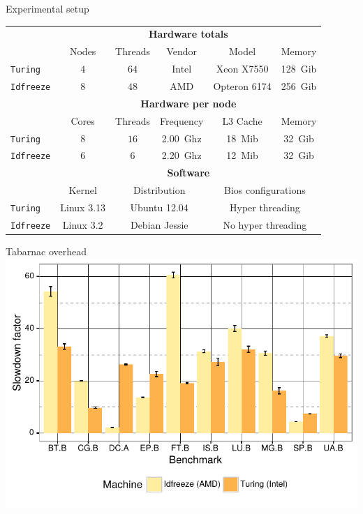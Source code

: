 \documentclass[xcolor={usenames,dvipsnames},hyperref={pdfusetitle}]{beamer}
\begin{document}
\setcounter{framenumber}{\value{finalframe}}
\begin{frame}{Experimental setup}
    \small
    \centering
    \begin{tabular}{lccccc}
        \toprule
        & \multicolumn{5}{c}{\textbf{Hardware totals}}\\
        \cmidrule(lr){2-6}
        & Nodes & Threads & Vendor & Model & Memory \\
        \cmidrule(lr){2-6}
        \texttt{Turing}   & $4$ & $64$ & Intel & Xeon X7550   & \SI{128}{Gib} \\
        \texttt{Idfreeze} & $8$ & $48$ & AMD   & Opteron 6174 & \SI{256}{Gib}\\
        \midrule
        & \multicolumn{5}{c}{\textbf{Hardware per node}}\\
        \cmidrule(lr){2-6}
        & Cores & Threads & Frequency & L3 Cache & Memory \\
        \cmidrule(lr){2-6}
        \texttt{Turing}   & $8$ & $16$ & \SI{2.00}{Ghz}& \SI{18}{Mib} & \SI{32}{Gib} \\
        \texttt{Idfreeze} & $6$ & $6$  & \SI{2.20}{Ghz}& \SI{12}{Mib} & \SI{32}{Gib}\\
        \midrule
        & \multicolumn{5}{c}{\textbf{Software}}\\
        \cmidrule(lr){2-6}
        & Kernel & \multicolumn{2}{c}{Distribution} &
        \multicolumn{2}{c}{Bios configurations} \\
        \cmidrule(lr){2-6}
        \texttt{Turing}   & Linux 3.13 & \multicolumn{2}{c}{Ubuntu 12.04} &
        \multicolumn{2}{c}{Hyper threading} \\
        \texttt{Idfreeze} & Linux 3.2 & \multicolumn{2}{c}{Debian Jessie} &
        \multicolumn{2}{c}{No hyper threading}\\
        \bottomrule
    \end{tabular}
\end{frame}

\setcounter{framenumber}{\value{finalframe}}
\begin{frame}{Tabarnac overhead}
    \includegraphics[width=\linewidth]{tabarnac/tool-ovh.pdf}
\end{frame}

\end{document}
